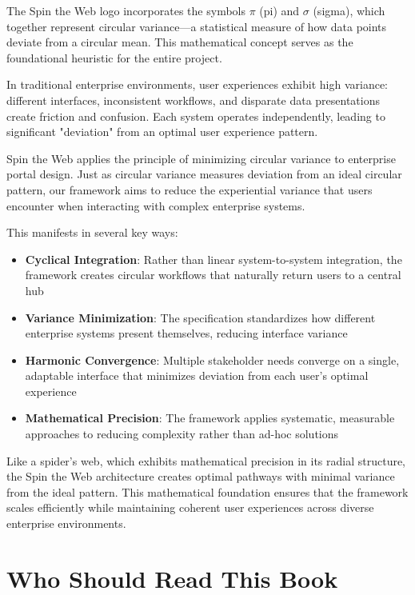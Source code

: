 The Spin the Web logo incorporates the symbols $\pi$ (pi) and $\sigma$ (sigma), which together represent circular variance—a statistical measure of how data points deviate from a circular mean. This mathematical concept serves as the foundational heuristic for the entire project.

In traditional enterprise environments, user experiences exhibit high variance: different interfaces, inconsistent workflows, and disparate data presentations create friction and confusion. Each system operates independently, leading to significant "deviation" from an optimal user experience pattern.

Spin the Web applies the principle of minimizing circular variance to enterprise portal design. Just as circular variance measures deviation from an ideal circular pattern, our framework aims to reduce the experiential variance that users encounter when interacting with complex enterprise systems.

This manifests in several key ways:
\begin{itemize}
\item \textbf{Cyclical Integration}: Rather than linear system-to-system integration, the framework creates circular workflows that naturally return users to a central hub
\item \textbf{Variance Minimization}: The \wbdl specification standardizes how different enterprise systems present themselves, reducing interface variance
\item \textbf{Harmonic Convergence}: Multiple stakeholder needs converge on a single, adaptable interface that minimizes deviation from each user's optimal experience
\item \textbf{Mathematical Precision}: The framework applies systematic, measurable approaches to reducing complexity rather than ad-hoc solutions
\end{itemize}

Like a spider's web, which exhibits mathematical precision in its radial structure, the Spin the Web architecture creates optimal pathways with minimal variance from the ideal pattern. This mathematical foundation ensures that the framework scales efficiently while maintaining coherent user experiences across diverse enterprise environments.

\section*{Who Should Read This Book}

